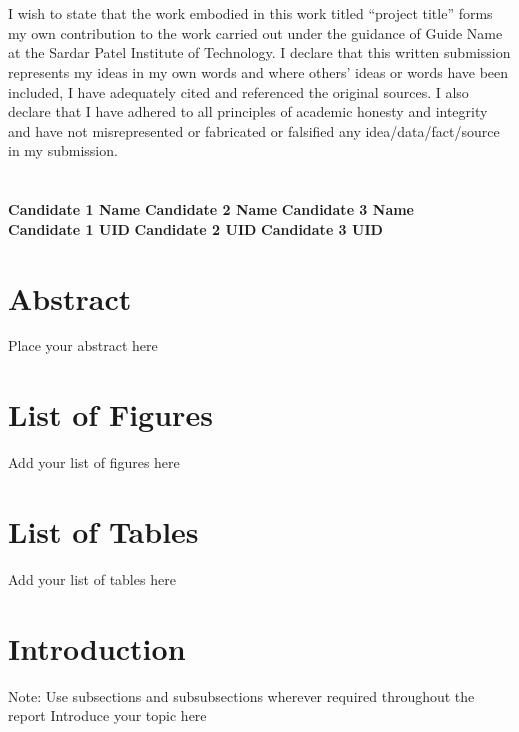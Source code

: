 \documentclass[12pt,singleside,a4paper]{article}
\begin{document}


\section*{}

\vspace{3.5cm}
I wish to state that the work embodied in this work titled “project title” forms my own contribution to the work carried out under the guidance of Guide Name at the Sardar Patel Institute of Technology. I declare that this written submission represents my ideas in my own words and where others' ideas or words have been included, I have adequately cited and referenced the original sources. I also declare that I have adhered to all principles of academic honesty and integrity and have not misrepresented or fabricated or falsified any idea/data/fact/source in my submission.
\\
\\
\\
\textbf{Candidate 1 Name} \hspace{2cm} \textbf{Candidate 2 Name} \hspace{2cm} \textbf{Candidate 3 Name}\\ 
\vspace{4cm}
\textbf{Candidate 1 UID} \hspace{3cm} \textbf{Candidate 2 UID} \hspace{2cm} \textbf{Candidate 3 UID}\\ 
\vspace{1cm}

\pagebreak
\section*{Abstract}
Place your abstract here
\pagebreak
\section*{List of Figures}
Add your list of figures here
\pagebreak
\section*{List of Tables}
Add your list of tables here
\pagebreak
\tableofcontents
\pagebreak
\section{Introduction}
Note: Use subsections and subsubsections wherever required throughout the report
\newline Introduce your topic here
\end{document}
